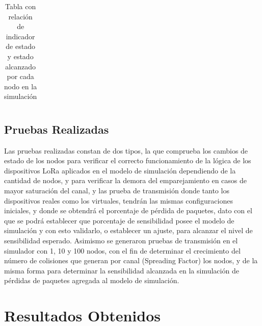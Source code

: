 \begin{justify}
\begin{table}[!ht]
\begin{tabular}{|c|c|c|}
\end{tabular}
\caption{Tabla con relación de indicador de estado y estado alcanzado por cada nodo en la simulación}
\label{tab:estados}
\end{table}

\subsection{Pruebas Realizadas}
Las pruebas realizadas constan de dos tipos, la que comprueba los cambios de estado de los nodos para verificar el correcto funcionamiento de la lógica de los dispositivos LoRa aplicados en el modelo de simulación dependiendo de la cantidad de nodos, y para verificar la demora del emparejamiento en casos de mayor saturación del canal, y las prueba de transmisión donde tanto los dispositivos reales como los virtuales, tendrán las mismas configuraciones iniciales, y donde se obtendrá el porcentaje de pérdida de paquetes, dato con el que se podrá establecer que porcentaje de sensibilidad posee el modelo de simulación y con esto validarlo, o establecer un ajuste, para alcanzar el nivel de sensibilidad esperado. Asimismo se generaron pruebas de transmisión en el simulador con 1, 10 y 100 nodos, con el fin de determinar el crecimiento del número de colisiones que generan por canal (Spreading Factor) los nodos, y de la misma forma para determinar la sensibilidad alcanzada en la simulación de pérdidas de paquetes agregada al modelo de simulación.

\section{Resultados Obtenidos}

\end{justify}
